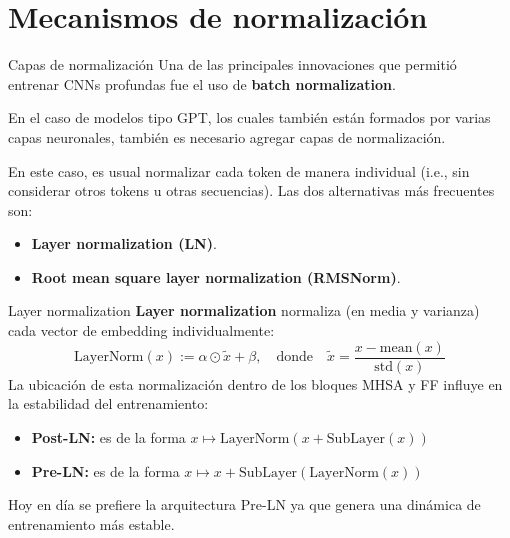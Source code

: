 \documentclass{beamer}
\begin{document}
\section{Mecanismos de normalización}

\begin{frame}{Capas de normalización}
    Una de las principales innovaciones que permitió entrenar CNNs profundas fue el uso de \textbf{batch normalization}.

    En el caso de modelos tipo GPT, los cuales también están formados por varias capas neuronales, también es necesario agregar capas de normalización.

    En este caso, es usual normalizar cada token de manera individual (i.e., sin considerar otros tokens u otras secuencias). Las dos alternativas más frecuentes son:
    \begin{itemize}
        \item \textbf{Layer normalization (LN)}.
        \item \textbf{Root mean square layer normalization (RMSNorm)}.
    \end{itemize}
\end{frame}

\begin{frame}{Layer normalization}
    \textbf{Layer normalization} normaliza (en media y varianza) cada vector de embedding individualmente:
    \begin{equation*}
        \text{LayerNorm}(x) := \alpha \odot \tilde{x} + \beta,
        \quad\text{donde}\quad
        \tilde{x} = \frac{x - \text{mean}(x)}{\text{std}(x)}
    \end{equation*}
    La ubicación de esta normalización dentro de los bloques MHSA y FF influye en la estabilidad del entrenamiento:
    \begin{itemize}
        \item \textbf{Post-LN:} es de la forma $x\mapsto\text{LayerNorm}(x+\text{SubLayer}(x))$
        \item \textbf{Pre-LN:} es de la forma $x\mapsto x+\text{SubLayer}(\text{LayerNorm}(x))$
    \end{itemize}
    Hoy en día se prefiere la arquitectura Pre-LN ya que genera una dinámica de entrenamiento más estable.
\end{frame}
\end{document}
